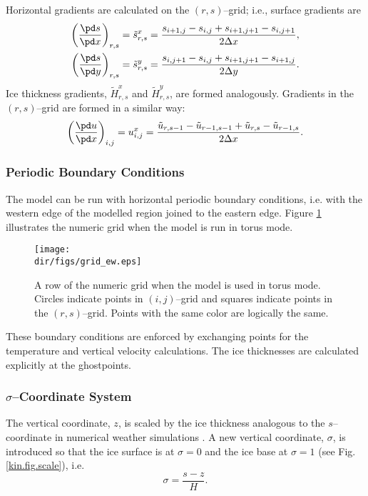 Horizontal gradients are calculated on the $(r,s)$--grid; i.e., surface gradients are
\begin{subequations}
\begin{align}
  \left(\frac{\pd s}{\pd x}\right)_{r,s}=\tilde{s}^x_{r,s}&=\frac{s_{i+1,j}-s_{i,j}+s_{i+1,j+1}-s_{i,j+1}}{2\Delta x},\\
  \left(\frac{\pd s}{\pd y}\right)_{r,s}=\tilde{s}^y_{r,s}&=\frac{s_{i,j+1}-s_{i,j}+s_{i+1,j+1}-s_{i+1,j}}{2\Delta y}.
\end{align}  
\end{subequations}
Ice thickness gradients, $\tilde{H}^x_{r,s}$ and $\tilde{H}^y_{r,s}$, are formed analogously. Gradients in the $(r,s)$--grid are formed in a similar way: 
\begin{equation}
  \left(\frac{\pd u}{\pd x}\right)_{i,j}=u^x_{i,j}=\frac{\tilde{u}_{r,s-1}-\tilde{u}_{r-1,s-1}+\tilde{u}_{r,s}-\tilde{u}_{r-1,s}}{2\Delta x}.
\end{equation}

\subsubsection{Periodic Boundary Conditions}
The model can be run with horizontal periodic boundary conditions, i.e. with the western edge of the modelled region joined to the eastern edge. Figure \ref{num.fig.grid_ew} illustrates the numeric grid when the model is run in torus mode.

\begin{figure}[htbp]
  \centering
  \texttt{[image: \\dir/figs/grid\_ew.eps]}
  \caption{A row of the numeric grid when the model is used in torus mode. Circles indicate points in $(i,j)$--grid and squares indicate points in the $(r,s)$--grid. Points with the same color are logically the same.}
  \label{num.fig.grid_ew}
\end{figure}

These boundary conditions are enforced by exchanging points for the temperature and vertical velocity calculations. The ice thicknesses are calculated explicitly at the ghostpoints.

\subsubsection{$\sigma$--Coordinate System}\label{num.sec.sigma}
The vertical coordinate, $z$, is scaled by the ice thickness analogous to the $s$--coordinate in numerical weather simulations \citep[e.g.,][]{Holton1992}. A new vertical coordinate, $\sigma$, is introduced so that the ice surface is at $\sigma=0$ and the ice base at $\sigma=1$ (see Fig. \ref{kin.fig.scale}), i.e.
\begin{equation}
  \label{kin.eq.vertical_scale}
  \sigma=\frac{s-z}{H}.
\end{equation}

